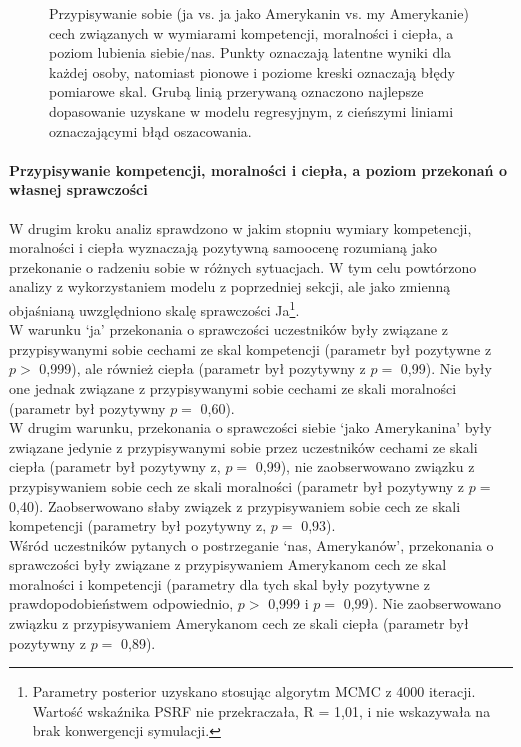 \documentclass[man]{apa6}
\begin{document}
\begin{figure*}[htbp]
   \centering
   \caption{Przypisywanie sobie (ja vs. ja jako Amerykanin vs. my Amerykanie) cech związanych w wymiarami kompetencji, moralności i ciepła, a poziom lubienia siebie/nas. Punkty oznaczają latentne wyniki dla każdej osoby, natomiast pionowe i poziome kreski oznaczają błędy pomiarowe skal. Grubą linią przerywaną oznaczono najlepsze dopasowanie uzyskane w modelu regresyjnym, z cieńszymi liniami oznaczającymi błąd oszacowania.}
   \label{fig:study2a}
\end{figure*}


\paragraph{Przypisywanie kompetencji, moralności i ciepła, a poziom przekonań o własnej sprawczości}
W drugim kroku analiz sprawdzono w jakim stopniu wymiary kompetencji, moralności i ciepła wyznaczają pozytywną samoocenę rozumianą jako przekonanie o radzeniu sobie w różnych sytuacjach. W tym celu powtórzono analizy z wykorzystaniem modelu z poprzedniej sekcji, ale jako zmienną objaśnianą uwzględniono skalę sprawczości Ja\footnote{Parametry posterior uzyskano stosując algorytm MCMC z 4000 iteracji. Wartość wskaźnika PSRF nie przekraczała, R = 1,01, i nie wskazywała na brak konwergencji symulacji.}. \\

W warunku `ja' przekonania o sprawczości uczestników były związane z przypisywanymi sobie cechami ze skal kompetencji (parametr był pozytywne z $p >$ 0,999), ale również ciepła (parametr był pozytywny z $p =$ 0,99). Nie były one jednak związane z przypisywanymi sobie cechami ze skali moralności (parametr był pozytywny $p =$ 0,60). \\

W drugim warunku, przekonania o sprawczości siebie `jako Amerykanina' były związane jedynie z przypisywanymi sobie przez uczestników cechami ze skali ciepła (parametr był pozytywny z, $p =$ 0,99), nie zaobserwowano związku z przypisywaniem sobie cech ze skali moralności (parametr był pozytywny z $p =$ 0,40). Zaobserwowano słaby związek z przypisywaniem sobie cech ze skali kompetencji (parametry był pozytywny z, $p =$ 0,93).\\

Wśród uczestników pytanych o postrzeganie `nas, Amerykanów', przekonania o sprawczości były związane z przypisywaniem Amerykanom cech ze skal moralności i kompetencji (parametry dla tych skal były pozytywne z prawdopodobieństwem odpowiednio, $p >$ 0,999 i $p =$ 0,99). Nie zaobserwowano związku z przypisywaniem Amerykanom cech ze skali ciepła (parametr był pozytywny z $p =$ 0,89). \\
\end{document}
